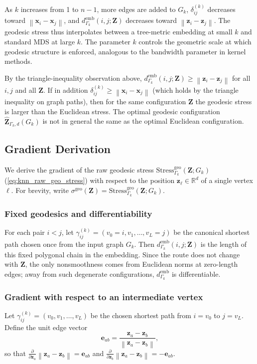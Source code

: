 \documentclass[11pt]{article}
\newcommand{\R}{\mathbb{R}}
\newcommand{\bx}{\mathbf{x}}
\newcommand{\bz}{\mathbf{z}}
\newcommand{\bZ}{\mathbf{Z}}
\newcommand{\norm}[1]{\left\|#1\right\|}
\newcommand{\demb}{d^{\mathrm{emb}}}
\newcommand{\Gk}{G_k}
\newcommand{\Stress}{\mathrm{Stress}}
\begin{document}
As $k$ increases from 1 to $n-1$, more edges are added to $\Gk$,
$\delta^{(k)}_{ij}$ decreases toward $\norm{\bx_i - \bx_j}$, and
$\demb_{\Gamma_k}(i,j;\bZ)$ decreases toward $\norm{\bz_i - \bz_j}$.  The
geodesic stress thus interpolates between a tree-metric embedding at small
$k$ and standard MDS at large $k$.  The parameter $k$ controls the
geometric scale at which geodesic structure is enforced, analogous to the
bandwidth parameter in kernel methods.

By the triangle-inequality observation above,
$\demb_{\Gamma_k}(i,j;\bZ) \geq \norm{\bz_i - \bz_j}$
for all $i,j$ and all $\bZ$.  If in addition $\delta^{(k)}_{ij} \geq
\norm{\bx_i - \bx_j}$ (which holds by the triangle inequality on graph
paths), then for the same configuration $\bZ$ the geodesic stress is
larger than the Euclidean stress.  The optimal geodesic configuration
$\hat{\bZ}_{\Gamma_k,d}(\Gk)$ is not in general the same as the optimal
Euclidean configuration.

\subsection{Gradient Derivation}
\label{sec:gradient}

We derive the gradient of the raw geodesic stress
$\Stress^{\mathrm{geo}}_{\Gamma_k}(\bZ; \Gk)$
(\cref{eq:knn_raw_geo_stress}) with respect to the position
$\bz_\ell \in \R^d$ of a single vertex $\ell$.  For brevity, write
$\sigma^{\mathrm{geo}}(\bZ) = \Stress^{\mathrm{geo}}_{\Gamma_k}(\bZ; \Gk)$.

\subsubsection*{Fixed geodesics and differentiability}
For each pair $i < j$, let
$\gamma_{ij}^{(k)} = (v_0 = i, v_1, \ldots, v_L = j)$ be the canonical
shortest path chosen once from the input graph $\Gk$.  Then
$\demb_{\Gamma_k}(i,j;\bZ)$ is the length of this fixed polygonal chain in the
embedding.  Since the route does not change with $\bZ$, the only
nonsmoothness comes from Euclidean norms at zero-length edges; away from
such degenerate configurations, $\demb_{\Gamma_k}$ is differentiable.

\subsubsection*{Gradient with respect to an intermediate vertex}
Let $\gamma_{ij}^{(k)} = (v_0, v_1, \ldots, v_L)$ be the chosen shortest
path from $i = v_0$ to $j = v_L$.  Define the unit edge vector
\begin{equation}
  \mathbf{e}_{ab} = \frac{\bz_a - \bz_b}{\norm{\bz_a - \bz_b}},
  \label{eq:unit_edge}
\end{equation}
so that $\frac{\partial}{\partial \bz_a}\norm{\bz_a - \bz_b} = \mathbf{e}_{ab}$
and $\frac{\partial}{\partial \bz_b}\norm{\bz_a - \bz_b} = -\mathbf{e}_{ab}$.
\end{document}
